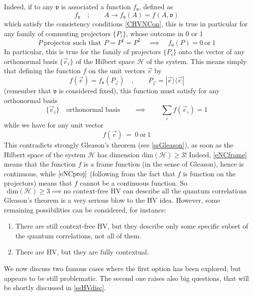 Indeed, if to any $\mathfrak{v}$ is associated a function $f_\mathfrak{v}$, defined as
\begin{equation}
\label{ }
f_\mathfrak{v}\quad;\qquad A\to f_\mathfrak{v}(A)=f(A,\mathfrak{v})
\end{equation}
which satisfy  the consistency conditions \ref{CHVNCon}, this is true in particular for any family of commuting projectors $\{P_i\}$, whose outcome in $0$ or $1$
\begin{equation}
\label{ }
P\ \text{projector such that}\ \ P=P^\dagger=P^2\quad\implies\quad f_\mathfrak{v}(P)=0\ \text{or}\ 1
\end{equation}
In particular, this is true for the family of projectors $\{P_i\}$ onto the vector of any orthonormal basis $\{\vec e_i\}$ of the Hilbert space $\mathcal{H}$ of the system. This means simply that defining the function $f$ on the unit vectors $\vec e$ by 
\begin{equation}
\label{eNCdef}
f(\vec e)=f_\mathfrak{v}(P_{\vec e})\quad,\qquad P_{\vec e}=|\vec e\rangle\langle \vec e|
\end{equation}
(remember that $\mathfrak{v}$ is considered fixed), this function must satisfy for any orthonormal basis 
\begin{equation}
\label{eNCframe}
\{\vec e_i\}\quad\text{orthonormal basis}\qquad\implies\qquad \sum_i f(\vec e_i)=1
\end{equation}
while we have for any unit vector
\begin{equation}
\label{eNCproj}
f(\vec e)\ =\ 0\ \text{or}\ 1
\end{equation}
This contradicts strongly Gleason's theorem (see \ref{ssGleason}), as soon as the Hilbert space of the system $\mathcal{H}$ has dimension $\text{dim}(\mathcal{H}) \ge 3$! 
Indeed, \ref{eNCframe} means that the function $f$ is a frame function (in the sense of Gleason), hence is continuous, while $\ref{eNCproj}$ (following from the fact that $f$ is function on the projectors) means that $f$ cannot be a continuous function. So
\begin{equation}
\label{ }
\text{dim}(\mathcal{H}) \ge 3\implies\text{no context-free HV can describe  all the quantum correlations}
\end{equation}
Gleason's theorem is a very serious blow to the HV idea. However, some remaining possibilities can be considered, for instance:
\begin{enumerate}
 \item There are still context-free HV, but they describe only some specific subset of the quantum correlations, not all of them.
  \item There are HV, but they are fully contextual.
\end{enumerate} 
We now discuss two famous cases where the first  option has been explored, but appears to be still problematic.
The second one raises also big questions, that will be shortly discussed in \ref{ssHVdisc}.
 
